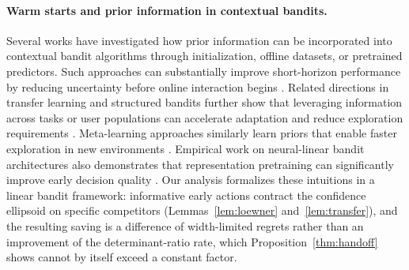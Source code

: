 \documentclass[anon]{alt2027} %
\begin{document}
\paragraph{Warm starts and prior information in contextual bandits.}
Several works have investigated how prior information can be incorporated
into contextual bandit algorithms through initialization, offline datasets,
or pretrained predictors. Such approaches can substantially improve
short-horizon performance by reducing uncertainty before online interaction
begins \citep{bastani2021mostly,zhang2019warm}. Related directions in
transfer learning and structured bandits further show that leveraging
information across tasks or user populations can accelerate adaptation and
reduce exploration requirements \citep{lazaric2012transfer,gentile2014online}.
Meta-learning approaches similarly learn priors that enable faster
exploration in new environments \citep{sharaf2019meta}. Empirical work on
neural-linear bandit architectures also demonstrates that representation
pretraining can significantly improve early decision quality
\citep{riquelme2018deep}. Our analysis formalizes these intuitions in a
linear bandit framework: informative early actions contract the confidence
ellipsoid on specific competitors (Lemmas~\ref{lem:loewner}
and~\ref{lem:transfer}), and the resulting saving is a difference of
width-limited regrets rather than an improvement of the
determinant-ratio rate, which Proposition~\ref{thm:handoff} shows cannot by
itself exceed a constant factor.
\end{document}
